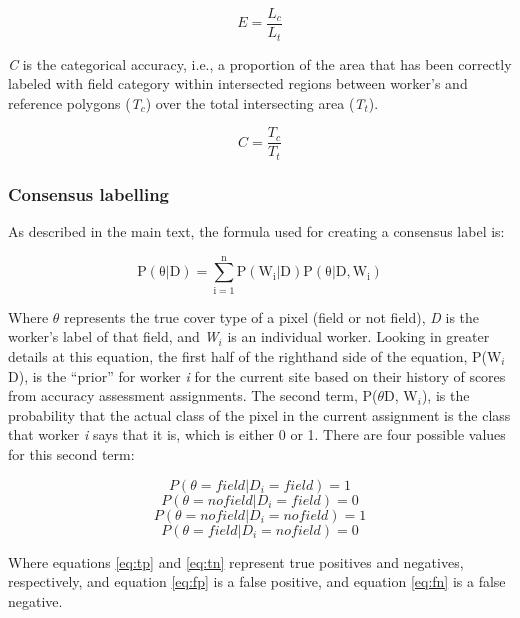 \documentclass[
  11pt,
  a4paper]{article}
\begin{document}
\[ E=\frac{L_c}{L_t}\]

\emph{C} is the categorical accuracy, i.e., a proportion of the area
that has been correctly labeled with field category within intersected
regions between worker's and reference polygons (\emph{T\(_c\)}) over
the total intersecting area (\emph{T\(_t\)}).

\[ C=\frac{T_c}{T_t}\]

\hypertarget{consensus-labelling}{%
\subsubsection{Consensus labelling}\label{consensus-labelling}}

As described in the main text, the formula used for creating a consensus
label is:

\begin{equation} \label{eq:main}
\mathrm{P(\theta|D)=\sum_{i=1}^{n}P(W_i|D)P(\theta|D, W_i)}
\end{equation}

Where \(\theta\) represents the true cover type of a pixel (field or not
field), \emph{D} is the worker's label of that field, and \emph{W\(_i\)}
is an individual worker. Looking in greater details at this equation,
the first half of the righthand side of the equation,
P(W\(_i\)\textbar D), is the ``prior'' for worker \emph{i} for the
current site based on their history of scores from accuracy assessment
assignments. The second term, P(\(\theta\)\textbar D, W\(_i\)), is the
probability that the actual class of the pixel in the current assignment
is the class that worker \emph{i} says that it is, which is either 0 or
1. There are four possible values for this second term:

\begin{equation} \label{eq:tp}
P(\theta = field|D_i = field) = 1
\end{equation} \begin{equation} \label{eq:fp}
P(\theta = no field|D_i = field) = 0
\end{equation} \begin{equation} \label{eq:tn}
P(\theta = no field|D_i = no field) = 1
\end{equation} \begin{equation} \label{eq:fn}
P(\theta = field|D_i = no field) = 0
\end{equation}

Where equations \ref{eq:tp} and \ref{eq:tn} represent true positives and
negatives, respectively, and equation \ref{eq:fp} is a false positive,
and equation \ref{eq:fn} is a false negative.
\end{document}
